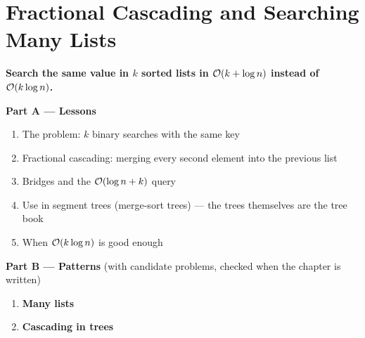 \chapter{Fractional Cascading and Searching Many Lists}
\label{ch:cascading}

\begin{tcolorbox}[enhanced, colback=white, colframe=secondaryblue, boxrule=1pt, arc=2mm]
\textbf{\large\textcolor{primaryblue}{Search the same value in $k$ sorted lists in $\mathcal{O}(k + \log n)$ instead of $\mathcal{O}(k \log n)$.}}
\end{tcolorbox}


\begin{plannedbox}
\textbf{Part A --- Lessons}
\begin{enumerate}[leftmargin=*, label=\textbf{A\arabic*.}, itemsep=1pt]
    \item The problem: $k$ binary searches with the same key
    \item Fractional cascading: merging every second element into the previous list
    \item Bridges and the $\mathcal{O}(\log n + k)$ query
    \item Use in segment trees (merge-sort trees) --- the trees themselves are the tree book
    \item When $\mathcal{O}(k\log n)$ is good enough
\end{enumerate}
\textbf{Part B --- Patterns} (with candidate problems, checked when the chapter is written)
\begin{enumerate}[leftmargin=*, label=\textbf{P\arabic*.}, itemsep=1pt]
    \item \textbf{Many lists}
    \item \textbf{Cascading in trees}
\end{enumerate}
\end{plannedbox}
